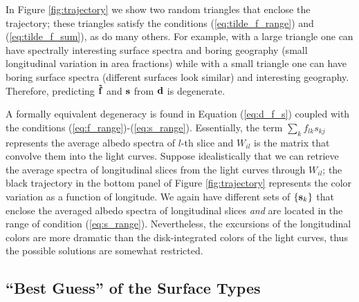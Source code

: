 \documentclass[iop,numberedappendix,apj]{emulateapj}
\def\fast{\tilde f}
\begin{document}

In Figure \ref{fig:trajectory} we show two random triangles that enclose the trajectory; these triangles satisfy the conditions (\ref{eq:tilde_f_range}) and (\ref{eq:tilde_f_sum}), as do many others. 
For example, with a large triangle one can have spectrally interesting surface spectra and boring geography (small longitudinal variation in area fractions) while with a small triangle one can have boring surface spectra (different surfaces look similar) and interesting geography. 
Therefore, predicting ${\bf \fast }$ and ${\bf s}$ from ${\bf d}$ is degenerate.  

A formally equivalent degeneracy is found in Equation (\ref{eq:d_f_s}) coupled with the conditions (\ref{eq:f_range})-(\ref{eq:s_range}). 
Essentially, the term $\sum _k f_{lk} s_{kj}$ represents the average albedo spectra of $l$-th slice and $W_{il}$ is the matrix that convolve them into the light curves. 
Suppose idealistically that we can retrieve the average spectra of longitudinal slices from the light curves through $W_{il}$; the black trajectory in the bottom panel of Figure \ref{fig:trajectory} represents the color variation as a function of longitude.  
We again have different sets of $\{ {\bf s}_k \}$ that enclose the averaged albedo spectra of longitudinal slices {\it and} are located in the range of condition (\ref{eq:s_range}). 
Nevertheless, the excursions of the longitudinal colors are more dramatic than the disk-integrated colors of the light curves, thus the possible solutions are somewhat restricted. 


\subsection{``Best Guess'' of the Surface Types}
\label{ss:guess}
\end{document}
